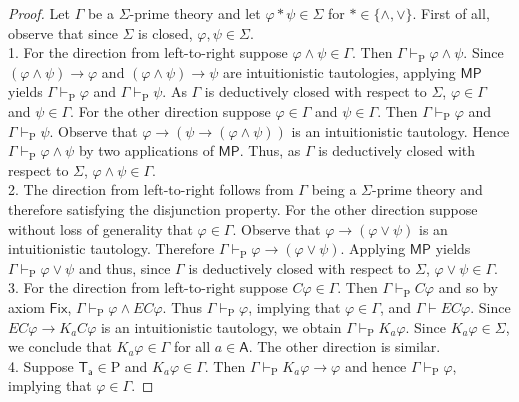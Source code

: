 \documentclass{myifcolog}
\newcommand\C {C}
\newcommand{\K}{K}
\newcommand\A{\mathsf{A}}
\newcommand{\agi}{a}
\newcommand{\E}{E}
\newcommand{\hickp}{\mathrm{P}}
\numberwithin{theorem}{section}
\begin{document}
\begin{proof}
 Let $\Gamma$ be a $\Sigma$-prime theory and let $\varphi \ast \psi \in \Sigma$ for $\ast \in \{\wedge, \vee\}$. First of all, observe that since $\Sigma$ is closed, $\varphi, \psi \in \Sigma$. \smallskip \\
  1. For the direction from left-to-right suppose $\varphi \wedge \psi \in \Gamma$. Then $\Gamma \vdash_\hickp \varphi \wedge \psi$. Since $(\varphi \wedge \psi) \rightarrow \varphi$ and $(\varphi \wedge \psi) \rightarrow \psi$ are intuitionistic tautologies, applying $\mathsf{MP}$ yields $\Gamma \vdash_\hickp \varphi$ and $\Gamma \vdash_\hickp \psi$. As $\Gamma$ is deductively closed with respect to $\Sigma$, $\varphi \in \Gamma$ and $\psi \in \Gamma$. For the other direction suppose $\varphi \in \Gamma$ and $\psi \in \Gamma$. Then $\Gamma \vdash_\hickp \varphi$ and $\Gamma \vdash_\hickp \psi$. Observe that $\varphi \rightarrow (\psi \rightarrow (\varphi \wedge \psi))$ is an intuitionistic tautology. Hence $\Gamma \vdash_\hickp \varphi \wedge \psi$ by two applications of $\mathsf{MP}$. Thus, as $\Gamma$ is deductively closed with respect to $\Sigma$, $\varphi \wedge \psi \in \Gamma$. \smallskip \\
2. The direction from left-to-right follows from $\Gamma$ being a $\Sigma$-prime theory and therefore satisfying the disjunction property. For the other direction suppose without loss of generality that $\varphi \in \Gamma$. Observe that $\varphi \rightarrow (\varphi \vee \psi)$ is an intuitionistic tautology. Therefore $\Gamma \vdash_\hickp \varphi \rightarrow (\varphi \vee \psi)$. Applying $\mathsf{MP}$ yields $\Gamma \vdash_\hickp \varphi \vee \psi$ and thus, since $\Gamma$ is deductively closed with respect to $\Sigma$, $\varphi \vee \psi \in \Gamma$. \smallskip \\
3. For the direction from left-to-right suppose $\C \varphi \in \Gamma$. Then $\Gamma \vdash_\hickp \C \varphi$ and so by axiom $\mathsf{Fix}$, $\Gamma \vdash_\hickp \varphi \wedge \E \C \varphi$. Thus $\Gamma \vdash_\hickp \varphi$, implying that $\varphi \in \Gamma$, and $\Gamma \vdash \E \C \varphi$. Since  $\E \C \varphi \to \K_\agi \C \varphi$ is an intuitionistic tautology, we obtain $\Gamma \vdash_\hickp \K_\agi \varphi$. Since $\K_\agi \varphi \in \Sigma$, we conclude that $\K_\agi \varphi \in \Gamma$ for all $\agi \in \A$. The other direction is similar.\smallskip \\
4. Suppose $\mathsf{T_\agi} \in \mathrm{P}$ and $\K_\agi \varphi \in \Gamma$. Then $\Gamma \vdash_\hickp \K_\agi \varphi \rightarrow \varphi$ and hence $\Gamma \vdash_\hickp \varphi$, implying that $\varphi \in \Gamma$. \qedhere

        
\end{proof}
\end{document}
